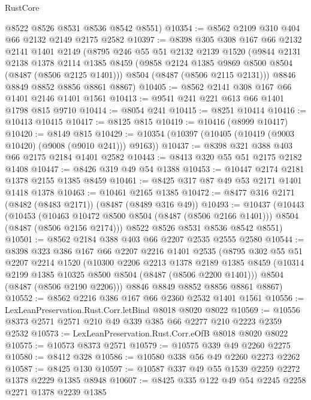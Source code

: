 \begin{lexlean}{RustCore}
\begin{coremodule}
      @8522
      @8526
      @8531
      @8536
      @8542
      @8551)
@10354 := @8562 @2109 @310 @404 @66 @2132 @2149 @2175 @2582
@10397 := @8398
    @305
    @308
    @167
    @66
    @2132
    @2141
    @1401
    @2149
    (@8795
      @246
      @55
      @51
      @2132
      @2139
      @1520
      (@9844
        @2131
        @2138
        @1378
        @2114
        @1385
        @8459
        (@9858 @2124 @1385 @9869 @8500 @8504 (@8487 (@8506 @2125 @1401)))
        @8504
        (@8487 (@8506 @2115 @2131)))
      @8846
      @8849
      @8852
      @8856
      @8861
      @8867)
@10405 := @8562 @2141 @308 @167 @66 @1401 @2146 @1401 @1561
@10413 := @9541 @241 @221 @613 @66 @1401 @1798 @815 @9710
@10414 := @8054 @241
@10415 := @8251 @10414
@10416 := @10413 @10415
@10417 := @8125 @815
@10419 := @10416 (@8999 @10417)
@10420 := @8149 @815
@10429 := @10354 (@10397 (@10405 (@10419 (@9003 @10420) (@9008 (@9010 @241))) @9163))
@10437 := @8398 @321 @388 @403 @66 @2175 @2184 @1401 @2582
@10443 := @8413 @320 @55 @51 @2175 @2182 @1408
@10447 := @8426 @319 @49 @54 @1388
@10453 := @10447 @2174 @2181 @1378 @2155 @1385 @8459
@10461 := @8425 @317 @87 @49 @53 @2171 @1401 @1418 @1378
@10463 := @10461 @2165 @1385
@10472 := @8477 @316 @2171 (@8482 (@8483 @2171)) (@8487 (@8489 @316 @49))
@10493 := @10437
    (@10443
      (@10453
        (@10463 @10472 @8500 @8504 (@8487 (@8506 @2166 @1401)))
        @8504
        (@8487 (@8506 @2156 @2174)))
      @8522
      @8526
      @8531
      @8536
      @8542
      @8551)
@10501 := @8562 @2184 @388 @403 @66 @2207 @2535 @2555 @2580
@10544 := @8398
    @323
    @386
    @167
    @66
    @2207
    @2216
    @1401
    @2535
    (@8795
      @302
      @55
      @51
      @2207
      @2214
      @1520
      (@10300
        @2206
        @2213
        @1378
        @2189
        @1385
        @8459
        (@10314 @2199 @1385 @10325 @8500 @8504 (@8487 (@8506 @2200 @1401)))
        @8504
        (@8487 (@8506 @2190 @2206)))
      @8846
      @8849
      @8852
      @8856
      @8861
      @8867)
@10552 := @8562 @2216 @386 @167 @66 @2360 @2532 @1401 @1561
@10556 := LexLeanPreservation.Rust.Corr.letBind @8018 @8020 @8022
@10569 := @10556 @8373 @2571 @2571 @210 @49 @339 @385 @66 @2277 @210 @2223 @2359 @2532
@10573 := LexLeanPreservation.Rust.Corr.eOfB @8018 @8020 @8022
@10575 := @10573 @8373 @2571
@10579 := @10575 @339 @49 @2260 @2275
@10580 := @8412 @328
@10586 := @10580 @338 @56 @49 @2260 @2273 @2262
@10587 := @8425 @130
@10597 := @10587 @337 @49 @55 @1539 @2259 @2272 @1378 @2229 @1385 @8948
@10607 := @8425 @335 @122 @49 @54 @2245 @2258 @2271 @1378 @2239 @1385

\end{coremodule}
\end{lexlean}
